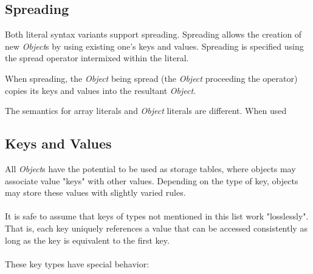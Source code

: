 \documentclass[12pt,letterpaper]{report}
\begin{document}



\subsection{Spreading}\label{Spreading}

Both literal syntax variants support spreading. Spreading allows the creation 
of new \textit{Object}s by using existing one's keys and values. Spreading is 
specified using the spread operator intermixed within the literal.

When spreading, the \textit{Object} being spread (the \textit{Object} proceeding the operator)
copies its keys and values into the resultant \textit{Object}.

The semantics for array literals and \textit{Object} literals are different.
When used 




\subsection{Keys and Values}\label{Keys and Values}

All \textit{Object}s have the potential to be used as storage tables, where objects may associate 
value "keys" with other values. Depending on the type of key, objects may store these values 
with slightly varied rules. 
\\\\
It is safe to assume that keys of types not mentioned in this list work "losslessly". That is, 
each key uniquely references a value that can be accessed consistently as long as the 
key is equivalent to the first key.
\\\\
These key types have special behavior:
\end{document}

